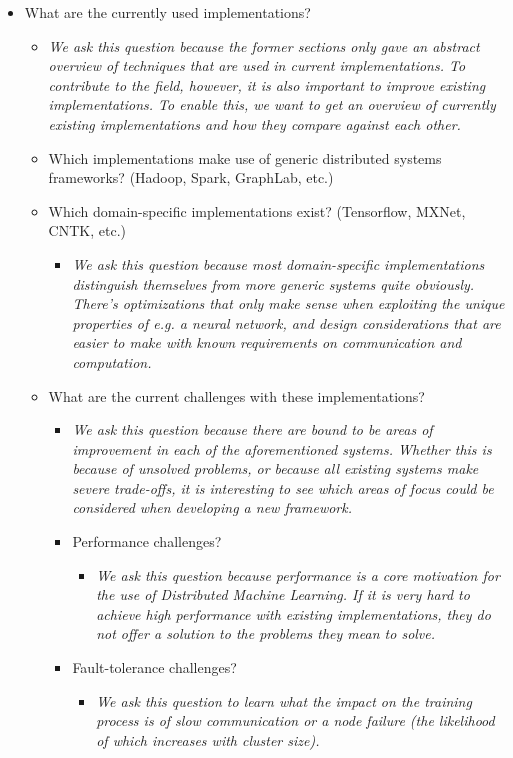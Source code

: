 \begin{itemize}
\begin{itemize}
	\end{itemize}
	\item What are the currently used implementations?
	\begin{itemize}
		\item \textit{We ask this question because the former sections only gave an abstract overview of techniques that are used in current implementations. To contribute to the field, however, it is also important to improve existing implementations. To enable this, we want to get an overview of currently existing implementations and how they compare against each other.}
		\item Which implementations make use of generic distributed systems frameworks? (Hadoop, Spark, GraphLab, etc.)
		\item Which domain-specific implementations exist? (Tensorflow, MXNet, CNTK, etc.)
		\begin{itemize}
			\item \textit{We ask this question because most domain-specific implementations distinguish themselves from more generic systems quite obviously. There’s optimizations that only make sense when exploiting the unique properties of e.g. a neural network, and design considerations that are easier to make with known requirements on communication and computation.}
		\end{itemize}
		\item What are the current challenges with these implementations?
		\begin{itemize}
			\item \textit{We ask this question because there are bound to be areas of improvement in each of the aforementioned systems. Whether this is because of unsolved problems, or because all existing systems make severe trade-offs, it is interesting to see which areas of focus could be considered when developing a new framework.}
			\item Performance challenges?
			\begin{itemize}
				\item \textit{We ask this question because performance is a core motivation for the use of Distributed Machine Learning. If it is very hard to achieve high performance with existing implementations, they do not offer a solution to the problems they mean to solve.}
			\end{itemize}
			\item Fault-tolerance challenges?
			\begin{itemize}
				\item \textit{We ask this question to learn what the impact on the training process is of slow communication or a node failure (the likelihood of which increases with cluster size).}

\end{itemize}
\end{itemize}
\end{itemize}
\end{itemize}
